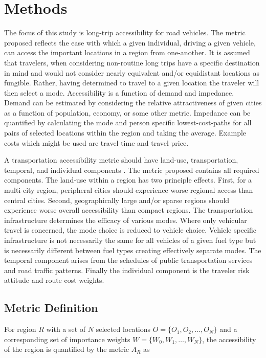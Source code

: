 \section*{Methods}

The focus of this study is long-trip accessibility for road vehicles. The metric proposed reflects the ease with which a given individual, driving a given vehicle, can access the important locations in a region from one-another. It is assumed that travelers, when considering non-routine long trips have a specific destination in mind and would not consider nearly equivalent and/or equidistant locations as fungible. Rather, having determined to travel to a given location the traveler will then select a mode. Accessibility is a function of demand and impedance. Demand can be estimated by considering the relative attractiveness of given cities as a function of population, economy, or some other metric. Impedance can be quantified by calculating the mode and person specific lowest-cost-paths for all pairs of selected locations within the region and taking the average. Example costs which might be used are travel time and travel price.

A transportation accessibility metric should have land-use, transportation, temporal, and individual components \cite{Karst_2003}. The metric proposed contains all required components. The land-use within a region has two principle effects. First, for a multi-city region, peripheral cities should experience worse regional access than central cities. Second, geographically large and/or sparse regions should experience worse overall accessibility than compact regions. The transportation infrastructure determines the efficacy of various modes. Where only vehicular travel is concerned, the mode choice is reduced to vehicle choice. Vehicle specific infrastructure is not necessarily the same for all vehicles of a given fuel type but is necessarily different between fuel types creating effectively separate modes. The temporal component arises from the schedules of public transportation services and road traffic patterns. Finally the individual component is the traveler risk attitude and route cost weights.

\subsection*{Metric Definition}

For region $R$ with a set of $N$ selected locations $O = \{O_1, O_2, \dots, O_N\}$ and a corresponding set of importance weights $W = \{W_0, W_1, \dots, W_N\}$, the accessibility of the region is quantified by the metric $A_{R}$ as

